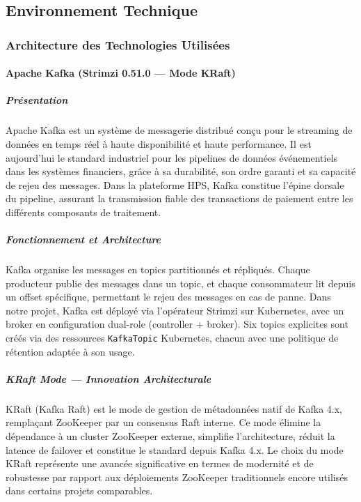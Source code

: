 \newpage

\subsection{Environnement Technique}
\vspace{0.3cm}

\subsubsection{Architecture des Technologies Utilisées}
\vspace{0.3cm}

\paragraph{Apache Kafka (Strimzi 0.51.0 --- Mode KRaft)}
\vspace{0.3cm}

\subparagraph{Présentation}
\vspace{0.1cm}
Apache Kafka est un système de messagerie distribué conçu pour le streaming de données en temps réel à haute disponibilité et haute performance. Il est aujourd'hui le standard industriel pour les pipelines de données événementiels dans les systèmes financiers, grâce à sa durabilité, son ordre garanti et sa capacité de rejeu des messages. Dans la plateforme HPS, Kafka constitue l'épine dorsale du pipeline, assurant la transmission fiable des transactions de paiement entre les différents composants de traitement.

\vspace{0.3cm}
\subparagraph{Fonctionnement et Architecture}
\vspace{0.1cm}
Kafka organise les messages en topics partitionnés et répliqués. Chaque producteur publie des messages dans un topic, et chaque consommateur lit depuis un offset spécifique, permettant le rejeu des messages en cas de panne. Dans notre projet, Kafka est déployé via l'opérateur Strimzi sur Kubernetes, avec un broker en configuration dual-role (controller + broker). Six topics explicites sont créés via des ressources \texttt{KafkaTopic} Kubernetes, chacun avec une politique de rétention adaptée à son usage.

\vspace{0.3cm}
\subparagraph{KRaft Mode --- Innovation Architecturale}
\vspace{0.1cm}
KRaft (Kafka Raft) est le mode de gestion de métadonnées natif de Kafka 4.x, remplaçant ZooKeeper par un consensus Raft interne. Ce mode élimine la dépendance à un cluster ZooKeeper externe, simplifie l'architecture, réduit la latence de failover et constitue le standard depuis Kafka 4.x. Le choix du mode KRaft représente une avancée significative en termes de modernité et de robustesse par rapport aux déploiements ZooKeeper traditionnels encore utilisés dans certains projets comparables.

